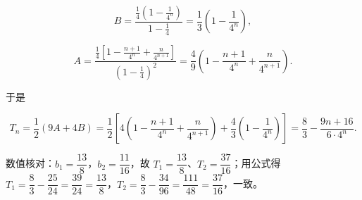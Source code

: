 \begin{answer}
\nopagebreak[4]
\[B=\frac{\frac14\left(1-\frac1{4^n}\right)}{1-\frac14}=\frac13\left(1-\frac1{4^n}\right),\]

\nopagebreak[4]
\[A=\frac{\frac14\left[1-\frac{n+1}{4^n}+\frac{n}{4^{n+1}}\right]}{\left(1-\frac14\right)^2}=\frac49\left(1-\frac{n+1}{4^n}+\frac{n}{4^{n+1}}\right).\]

于是

\nopagebreak[4]
\[T_n=\frac12\left(9A+4B\right)=\frac12\left[4\left(1-\frac{n+1}{4^n}+\frac{n}{4^{n+1}}\right)+\frac43\left(1-\frac1{4^n}\right)\right]=\frac83-\frac{9n+16}{6\cdot4^n}.\]

数值核对：$b_1=\dfrac{13}{8}$，$b_2=\dfrac{11}{16}$，故 $T_1=\dfrac{13}{8}$、$T_2=\dfrac{37}{16}$；用公式得 $T_1=\dfrac83-\dfrac{25}{24}=\dfrac{39}{24}=\dfrac{13}{8}$，$T_2=\dfrac83-\dfrac{34}{96}=\dfrac{111}{48}=\dfrac{37}{16}$，一致。


\end{answer}
